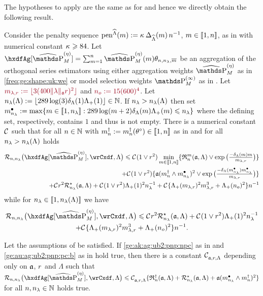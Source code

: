The hypotheses to apply  are the same as for  and hence we directly obtain the following result.
\begin{thm}
  Consider the   penalty sequence $\peneSv:=\peneD$,
  $\Di\in\nset{1,\ssY}$, as in  with numerical
  constant $\cpen\geq84$. Let
  $\hxdfAg[{\erWe[]}]=\sum_{\Di=1}^{\ssY} \erWe\hxdfPr$ be an
  aggregation of the orthogonal series estimators using either
  aggregation weights $\erWe[]$ as in \eqref{freq:ge:shape:uk:we} or model
  selection weights $\msWe[]$ as in . Let
  $\dr\Di_{\edf,\xdfCr}:=\floor{3(400\Vnorm[{\xdfCw[]}]{\edf}\xdfCr)^2}$
  and $\dr \ssY_{o}:=15({600})^4$. Let
  $\ssE(\Lambda):=\floor{289\log(3)\cmiSv[1]\miSv[1]}\in\Nz$. If
  $\ssE>\ssE(\Lambda)$ then set
  $\sDi{\ssE}:=\max\{\Di\in\nset{1,\ssE}:289\log(\Di+2)\cmiSv[\Di]\miSv[\Di]\leq\ssE\}$
  where the defining set, respectively, contains $1$ and thus is not
  empty.  There is a numerical constant $\cst{}$ such that for all
  $\ssY\in\Nz$ with $\aDi{\ssY}:=\aDi{\ssY}(\xdf)\in\nset{1,n}$ as in
   and for all $\ssE>\ssE(\Lambda)$ holds
  \begin{multline}
    \nmRi{\hxdfAg[{\erWe[]}]}{\rwCxdf,\Lambda}  
    \leq\cst{}(1\vee\xdfCr^2)\min_{\Di\in\nset{1,\ssY}}
    \{\daRa{\Di}{(\xdfCw[],\Lambda)}\vee
    \exp\big(\tfrac{-\cmiSv[\Di]\Di}{\Di_{\edf,\xdfCr}}\big)\} \\\hfill
    +\cst{}(1\vee\xdfCr^2)\{\xdfCw[(\aDi{\ssY}\wedge\sDi{\ssE})]^2\vee
    \exp\big(\tfrac{-\cmiSv[\sDi{\ssE}]\sDi{\ssE}}{\Di_{\edf,\xdfCr}}\big)\}\\\hfill
    +\cst{}\xdfCr^2\mmRa{\xdfCw[],\Lambda}   + \cst{}(1\vee\xdfCr^2)\miSv[1]^2\ssE^{-1}  
    +\cst{}\{\miSv[\Di_{\edf,\xdfCr}]^2\Di_{\edf,\xdfCr}^3+\miSv[\ssY_{o}]^2\}\ssY^{-1}
  \end{multline}
  while for $\ssE\in\nset{1,\ssE(\Lambda)}$ we have
  \begin{multline}
    \nmRi{\hxdfAg[{\erWe[]}]}{\rwCxdf,\Lambda}  
    \leq \cst{}\xdfCr^2\mmRa{\xdfCw[],\Lambda}
    + \cst{}(1\vee\xdfCr^2)\miSv[1]^2\ssE^{-1}\\
    +\cst{}\{\miSv[\Di_{\edf,\xdfCr}]^2\Di_{\edf,\xdfCr}^3+\miSv[\ssY_{o}]^2\}\ssY^{-1}.
  \end{multline}
\end{thm}


\begin{cor}
  Let the assumptions of  be satisfied.
    If  \ref{ge:ak:ag:ub2:pnp:npc} as in  and \ref{ge:au:ag:ub2:pnp:pc:b}
    as in  hold true, then there is a constant $\cst{\xdfCw[],\xdfCr,\Lambda}$ depending
    only on $\xdfCw[]$, $\xdfCr$ and $\Lambda$ such that $\nmRi{\hxdfAg[{\erWe[]}]}{\rwCxdf,\Lambda}
    \leq \cst{\xdfCw[],\xdfCr,\Lambda}\{\naRa{(\xdfCw[],\Lambda)}+\mmRa{\xdfCw[],\Lambda}+\xdfCw[(\sDi{\ssE}\wedge\aDi{\ssY})]^2\}$ for all $\ssY,\ssE\in\Nz$ holds true.
\end{cor}

